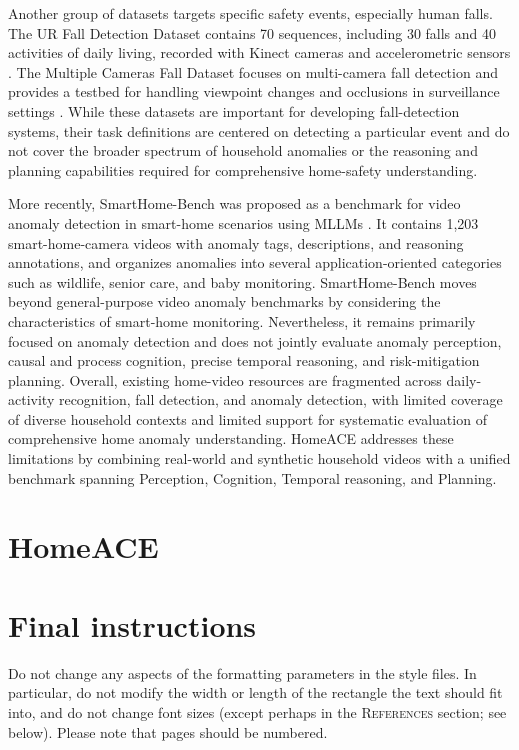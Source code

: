 \documentclass{article} %
\begin{document}
Another group of datasets targets specific safety events, especially human falls. The UR Fall Detection Dataset contains 70 sequences, including 30 falls and 40 activities of daily living, recorded with Kinect cameras and accelerometric sensors \citep{Kwolek2014URFall}. The Multiple Cameras Fall Dataset focuses on multi-camera fall detection and provides a testbed for handling viewpoint changes and occlusions in surveillance settings \citep{Auvinet2008MultipleCameraFall}. While these datasets are important for developing fall-detection systems, their task definitions are centered on detecting a particular event and do not cover the broader spectrum of household anomalies or the reasoning and planning capabilities required for comprehensive home-safety understanding.

More recently, SmartHome-Bench was proposed as a benchmark for video anomaly detection in smart-home scenarios using MLLMs \citep{Zhao2025SmartHomeBench}. It contains 1,203 smart-home-camera videos with anomaly tags, descriptions, and reasoning annotations, and organizes anomalies into several application-oriented categories such as wildlife, senior care, and baby monitoring. SmartHome-Bench moves beyond general-purpose video anomaly benchmarks by considering the characteristics of smart-home monitoring. Nevertheless, it remains primarily focused on anomaly detection and does not jointly evaluate anomaly perception, causal and process cognition, precise temporal reasoning, and risk-mitigation planning. Overall, existing home-video resources are fragmented across daily-activity recognition, fall detection, and anomaly detection, with limited coverage of diverse household contexts and limited support for systematic evaluation of comprehensive home anomaly understanding. HomeACE addresses these limitations by combining real-world and synthetic household videos with a unified benchmark spanning Perception, Cognition, Temporal reasoning, and Planning.


\section{HomeACE}


\section{Final instructions}
Do not change any aspects of the formatting parameters in the style files.
In particular, do not modify the width or length of the rectangle the text
should fit into, and do not change font sizes (except perhaps in the
\textsc{References} section; see below). Please note that pages should be
numbered.
\end{document}
